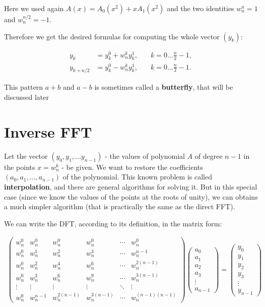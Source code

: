 \documentclass[12pt]{article}
\theoremstyle{definition}
\begin{document}
Here we used again $A(x) = A_0(x^2) + x A_1(x^2)$ and the two identities $w_n^n = 1$ and $w_n^{n/2} = -1$.

Therefore we get the desired formulas for computing the whole vector $(y_k)$:

\begin{align}
y_k &= y_k^0 + w_n^k y_k^1, &\quad k = 0 \dots \frac{n}{2} - 1, \\
y_{k+n/2} &= y_k^0 - w_n^k y_k^1, &\quad k = 0 \dots \frac{n}{2} - 1.
\end{align}


This pattern $a + b$ and $a - b$ is sometimes called a \textbf{butterfly}, that will be discussed later


\section{Inverse FFT}

Let the vector $(y_0, y_1, \dots y_{n-1})$ - the values of polynomial $A$ of degree $n - 1$ in the points $x = w_n^k$ - be given.
We want to restore the coefficients $(a_0, a_1, \dots, a_{n-1})$ of the polynomial.
This known problem is called \textbf{interpolation}, and there are general algorithms for solving it.
But in this special case (since we know the values of the points at the roots of unity), we can obtains a much simpler algorithm (that is practically the same as the direct FFT).

We can write the DFT, according to its definition, in the matrix form:

\begin{align}
\begin{pmatrix}
w_n^0 & w_n^0 & w_n^0 & w_n^0 & \cdots & w_n^0 \\
w_n^0 & w_n^1 & w_n^2 & w_n^3 & \cdots & w_n^{n-1} \\
w_n^0 & w_n^2 & w_n^4 & w_n^6 & \cdots & w_n^{2(n-1)} \\
w_n^0 & w_n^3 & w_n^6 & w_n^9 & \cdots & w_n^{3(n-1)} \\
\vdots & \vdots & \vdots & \vdots & \ddots & \vdots \\
w_n^0 & w_n^{n-1} & w_n^{2(n-1)} & w_n^{3(n-1)} & \cdots & w_n^{(n-1)(n-1)}
\end{pmatrix} \begin{pmatrix}
a_0 \\ a_1 \\ a_2 \\ a_3 \\ \vdots \\ a_{n-1}
\end{pmatrix} = \begin{pmatrix}
y_0 \\ y_1 \\ y_2 \\ y_3 \\ \vdots \\ y_{n-1}
\end{pmatrix}
\end{align}
\end{document}
